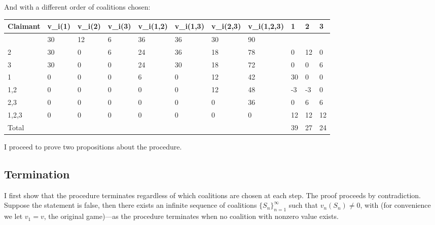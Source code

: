 \documentclass[12pt]{article}
\begin{document}
And with a different order of coalitions chosen:
\begin{table}[h]
  \scriptsize
\centering
\begin{tabular}{|l|l|l|l|l|l|l|l|l|l|l|}
\hline
Claimant & v\_i(1) & v\_i(2) & v\_i(3) & v\_i(1,2) & v\_i(1,3) & v\_i(2,3) & v\_i(1,2,3) & 1  & 2  & 3  \\ \hline
         & 30      & 12      & 6       & 36        & 36        & 30        & 90          &    &    &    \\ \hline
2        & 30      & 0       & 6       & 24        & 36        & 18        & 78          & 0  & 12 & 0  \\ \hline
3        & 30      & 0       & 0       & 24        & 30        & 18        & 72          & 0  & 0  & 6  \\ \hline
1        & 0       & 0       & 0       & 6         & 0         & 12        & 42          & 30 & 0  & 0  \\ \hline
1,2      & 0       & 0       & 0       & 0         & 0         & 12        & 48          & -3 & -3 & 0  \\ \hline
2,3      & 0       & 0       & 0       & 0         & 0         & 0         & 36          & 0  & 6  & 6  \\ \hline
1,2,3    & 0       & 0       & 0       & 0         & 0         & 0         & 0           & 12 & 12 & 12 \\ \hline
Total    &         &         &         &           &           &           &             & 39 & 27 & 24 \\ \hline
\end{tabular}
\end{table}

I proceed to prove two propositions about the procedure.

\subsection*{Termination}

I first show that the procedure terminates regardless of which coalitions are
chosen at each step. The proof proceeds by contradiction. Suppose the statement
is false,
then there exists an infinite sequence of coalitions $\{S_n\}_{n=1}^\infty$ such
that $v_{n}(S_n)\neq 0$, with (for convenience we let $v_1 = v$, the original
game)---as the procedure terminates when no coalition with nonzero value exists.
\end{document}
